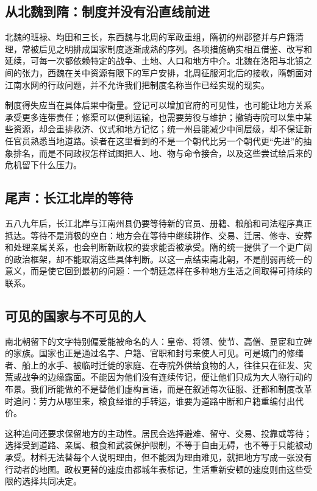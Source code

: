\subsection{从北魏到隋：制度并没有沿直线前进}

北魏的班禄、均田和三长，东西魏与北周的军政重组，隋初的州郡整并与户籍清理，常被后见之明排成国家制度逐渐成熟的序列。各项措施确实相互借鉴、改写和延续，可每一次都依赖特定的战争、土地、人口和地方中介。北魏在洛阳与北镇之间的张力，西魏在关中资源有限下的军户安排，北周征服河北后的接收，隋朝面对江南水网的行政问题，并不允许我们把制度名称当作已经实现的现实。

制度得失应当在具体后果中衡量。登记可以增加官府的可见性，也可能让地方关系承受更多连带责任；修渠可以便利运输，也需要劳役与维护；撤销寺院可以集中某些资源，却会重排救济、仪式和地方记忆；统一州县能减少中间层级，却不保证新任官员熟悉当地道路。读者在这里看到的不是一个朝代比另一个朝代更“先进”的抽象排名，而是不同政权怎样试图把人、地、物与命令接合，以及这些尝试给后来的危机留下什么压力。

\subsection{尾声：长江北岸的等待}

五八九年后，长江北岸与江南州县仍要等待新的官员、册籍、粮船和司法程序真正抵达。等待不是消极的空白：地方会在等待中继续耕作、交易、迁居、修寺、安葬和处理亲属关系，也会判断新政权的要求能否被承受。隋的统一提供了一个更广阔的政治框架，却不能取消这些具体判断。以这一点结束南北朝，不是削弱再统一的意义，而是使它回到最初的问题：一个朝廷怎样在多种地方生活之间取得可持续的联系。

\subsection{可见的国家与不可见的人}

南北朝留下的文字特别偏爱能被命名的人：皇帝、将领、使节、高僧、显宦和立碑的家族。国家也正是通过名字、户籍、官职和封号来使人可见。可是城门的修缮者、船上的水手、被临时迁徙的家庭、在寺院外供给食物的人，往往只在征发、灾荒或战争的边缘露面。不能因为他们没有连续传记，便让他们只成为大人物行动的布景。我们所能做的不是替他们虚构言语，而是在叙述每次征服、迁都和制度改革时追问：劳力从哪里来，粮食经谁的手转运，谁要为道路中断和户籍重编付出代价。

这种追问还要求保留地方的主动性。居民会选择避难、留守、交易、投靠或等待；选择受到道路、亲属、粮食和武装保护限制，不等于自由无碍，也不等于只能被动承受。材料无法替每个人说明理由，但不能因为理由难见，就把地方写成一张没有行动者的地图。政权更替的速度由都城年表标记，生活重新安顿的速度则由这些受限的选择共同决定。

